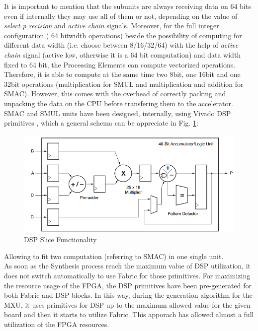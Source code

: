 It is important to mention that the subunits are always receiving data on 64 bits even if internally they may use all of them or not, depending on the value of \textit{select p recision}  and \textit{active chain} signals.
Moreover, for the full integer configuration ( 64 bitwidth operations) beside the possibility of computing for different data width (i.e. choose between 8/16/32/64) with the help of \textit{active chain} signal (active low, otherwise it is a 64 bit computation) and data width fixed to 64 bit, the Processing Elements can compute vectorized operations. Therefore, it is able to compute at the same time two 8bit, one 16bit and one 32bit operations (multiplication for SMUL and multiplication and addition for SMAC).
However, this comes with the overhead of correctly packing and unpacking the data on the CPU before transfering them to the accelerator.
\newpage
SMAC and SMUL units have been designed, internally, using Vivado DSP primitives \cite{paper:48}, which a general schema can be appreciate in Fig. \ref{fig:dsp}:
\begin{figure}[H]
\centering
\captionsetup{justification=centering}
\includegraphics[scale=0.5,angle=0]{./figure/vivado_dsp.png}
\caption{ DSP Slice Functionality\cite{paper:48} }
\label{fig:dsp}
\end{figure} 
Allowing to fit two computation (referring to SMAC) in one single unit.\\

As soon as the Synthesis process reach the maximum value of DSP utilization, it does not switch automatically to use Fabric for those primitives. For maximizing the resource usage of the FPGA, the DSP primitives have been pre-generated for both Fabric and DSP blocks. In this way, during the generation algorithm for the MXU, it uses primitives for DSP up to the maximum allowed value for the given board and then it starts to utilize Fabric.
This apporach has allowed almost a full utilization of the FPGA resources.

